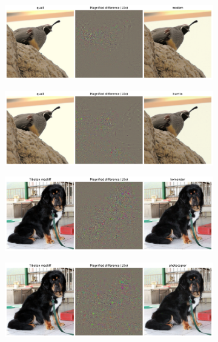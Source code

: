 \begin{figure}[H]
    \centering
    
    \begin{subfigure}{0.45\textwidth}
        \centering
        \includegraphics[width=\linewidth]{figs_propre2/adv_exmp.pdf}
        \caption{}
        \label{fig:adv_exmp:sub1}
    \end{subfigure}%
    \begin{subfigure}{0.45\textwidth}
        \centering
        \includegraphics[width=\linewidth]{figs_propre2/quail_burrito}
        \caption{}
        \label{fig:quail_burrito}
    \end{subfigure}

    \begin{subfigure}{0.45\textwidth}
        \centering
        \includegraphics[width=\linewidth]{figs_propre2/adv_exmp2.pdf}
        \caption{}
        \label{fig:adv_exmp:sub2}
    \end{subfigure}%
    \begin{subfigure}{0.45\textwidth}
        \centering
        \includegraphics[width=\linewidth]{figs_propre2/dog_photocopier}
        \caption{}
        \label{fig:dog_photocopier}
    \end{subfigure}


\end{figure}
